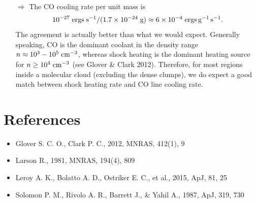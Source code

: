 \documentclass[12pt, letterpaper]{article}
\begin{document}
\begin{enumerate}
\item[$\Rightarrow$] The CO cooling rate per unit mass is
\begin{align}
    10^{-27}\rm\;ergs\;s^{-1} / (1.7 \times 10^{-24}\rm\;g) \approx 6 \times 10^{-4}\rm\;ergs\,g^{-1}\,s^{-1}.
\end{align}
The agreement is actually better than what we would expect. Generally speaking, CO is the dominant coolant in the density range $n \approx 10^3-10^5\rm\;cm^{-3}$, whereas shock heating is the dominant heating source for $n \geq 10^4\rm\;cm^{-3}$ (see Glover \& Clark 2012). Therefore, for most regions inside a molecular cloud (excluding the dense clumps), we do expect a good match between shock heating rate and CO line cooling rate.

\end{enumerate}

\section*{References}

\begin{itemize}
    \item Glover S. C. O., Clark P. C., 2012, MNRAS, 412(1), 9
    \item Larson R., 1981, MNRAS, 194(4), 809
    \item Leroy A. K., Bolatto A. D., Ostriker E. C., et al., 2015, ApJ, 81, 25
    \item Solomon P. M., Rivolo A. R., Barrett J., \& Yahil A., 1987, ApJ, 319, 730
\end{itemize}
\end{document}

